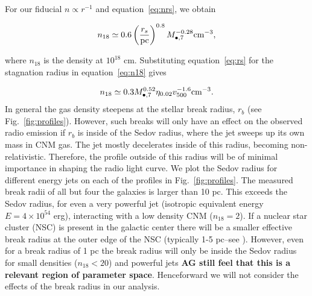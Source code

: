 \documentclass[usenatbib,fleqn]{mnras}
\newcommand{\Mbh}[1][]{M_{\bullet#1}}
\begin{document}
\noindent For our fiducial $n\propto r^{-1}$ and equation~\eqref{eq:nrs}, we
obtain

\begin{equation}
  n_{18}\simeq 0.6 \left(\frac{r_s}{\rm pc}\right)^{0.8}
  \Mbh[,7]^{-0.28} {\rm cm^{-3}},
  \label{eq:n18}
\end{equation}


\noindent where $n_{18}$ is the density at $10^{18}$ cm. Substituting
equation~\eqref{eq:rs} for the stagnation radius in
equation~\eqref{eq:n18} gives

\begin{equation}
n_{18}\simeq 0.3 \Mbh[,7]^{0.52} \eta_{0.02} v_{500}^{-1.6} {\rm
  cm^{-3}}.
\label{eq:n182}
\end{equation} 
%
In general the gas density steepens at the stellar break radius, $r_b$
(see Fig.~\ref{fig:profiles}). However, such breaks will only have an
effect on the observed radio emission if $r_b$ is inside of the Sedov
radius, where the jet sweeps up its own mass in CNM gas.  The jet
mostly decelerates inside of this radius, becoming
non-relativistic. Therefore, the profile outside of this radius will be of
minimal importance in shaping the radio light curve. We plot the Sedov
radius for different energy jets on each of the profiles in
Fig.~\ref{fig:profiles}. The measured break radii of all but four the
\citet{Lauer+2007} galaxies is larger than 10 pc. This exceeds
the Sedov radius, for even a very powerful jet (isotropic equivalent
energy $E=4\times 10^{54}$ erg), interacting with a low density CNM
($n_{18}=2$). If a nuclear star cluster (NSC) is present in the
galactic center there will be a smaller effective break radius at the
outer edge of the NSC (typically 1-5 pc--see
\citealt{Georgiev+2014}). However, even for a break radius of 1 pc the
break radius will only be inside the Sedov radius for small densities
($n_{18}<20$) and powerful jets {\bf AG still feel that this is a
  relevant region of parameter space}. Henceforward we will not
consider the effects of the break radius in our analysis.
\end{document}
